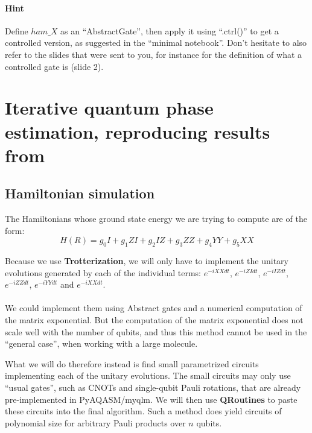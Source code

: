 \documentclass{article}
\begin{document}
\paragraph{Hint} Define $ham\_X$ as an ``AbstractGate'', then apply it using ``.ctrl()'' to get a controlled version, as suggested in 
the ``minimal notebook''. Don't hesitate to also refer to the slides that were sent to you, for instance for the definition of what
a controlled gate is (slide 2).

\section{Iterative quantum phase estimation, reproducing results from \textcolor{blue}{\cite{o2016scalable}}}

\subsection{Hamiltonian simulation}

The Hamiltonians whose ground state energy we are trying to compute are of the form: 
$$H(R) = g_{0}I+g_{1}ZI+g_{2}IZ+g_{3}ZZ+g_{4}YY+g_{5}XX $$

Because we use \textbf{Trotterization}, we will only have
to implement the unitary evolutions generated by each of the
individual terms: $e^{-iXXdt}$, $e^{-iZIdt}$, 
$e^{-iIZdt}$, $e^{-iZZdt}$, $e^{-iYYdt}$ and $e^{-iXXdt}$.

\paragraph{}
We could implement them using Abstract gates and a numerical
computation of the matrix exponential. But the computation of the
matrix exponential does not scale well with the number of qubits, 
and thus this method cannot be used in the ``general case'', when
working with a large molecule.

What we will do therefore instead is find small parametrized circuits 
implementing each of the unitary evolutions. The small circuits
may only use ``usual gates'', such as CNOTs and single-qubit Pauli
rotations, that are already pre-implemented in PyAQASM/myqlm.
We will then use \textbf{QRoutines} to paste these circuits into
the final algorithm. Such a method does yield circuits of polynomial
size for arbitrary Pauli products over $n$ qubits.
\end{document}
